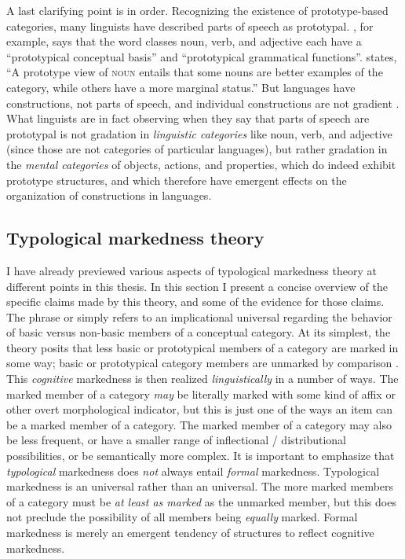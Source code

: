 A last clarifying point is in order. Recognizing the existence of prototype-based categories, many linguists have described parts of speech as prototypal. \textcite[1--2]{Dixon2004}, for example, says that the word classes noun, verb, and adjective each have a \enquote{prototypical conceptual basis} and \enquote{prototypical grammatical functions}. \textcite[217]{Taylor2003} states, \enquote{A prototype view of \textsc{noun} entails that some nouns are better examples of the category, while others have a more marginal status.} But languages have constructions, not parts of speech, and individual constructions are not gradient \parencite{Croft2007}. What linguists are in fact observing when they say that parts of speech are prototypal is not gradation in \emph{linguistic categories} like noun, verb, and adjective (since those are not categories of particular languages), but rather gradation in the \emph{mental categories} of objects, actions, and properties, which do indeed exhibit prototype structures, and which therefore have emergent effects on the organization of constructions in languages.

\subsection{Typological markedness theory}
\label{sec:2.4.2}

I have already previewed various aspects of typological markedness theory at different points in this thesis. In this section I present a concise overview of the specific claims made by this theory, and some of the evidence for those claims. The phrase  or  simply refers to an implicational universal regarding the behavior of basic versus non-basic members of a conceptual category. At its simplest, the theory posits that less basic or prototypical members of a category are marked in some way; basic or prototypical category members are unmarked by comparison \parencite{Greenberg1966}. This \emph{cognitive} markedness is then realized \emph{linguistically} in a number of ways. The marked member of a category \emph{may} be literally marked with some kind of affix or other overt morphological indicator, but this is just one of the ways an item can be a marked member of a category. The marked member of a category may also be less frequent, or have a smaller range of inflectional / distributional possibilities, or be semantically more complex. It is important to emphasize that \emph{typological} markedness does \emph{not} always entail \emph{formal} markedness. Typological markedness is an  universal rather than an  universal. The more marked members of a category must be \emph{at least as marked} as the unmarked member, but this does not preclude the possibility of all members being \emph{equally} marked. Formal markedness is merely an emergent tendency of structures to reflect cognitive markedness.

